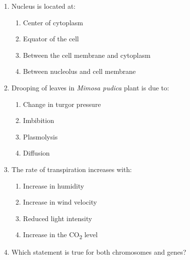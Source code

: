 \begin{enumerate}[label=(\roman*)]

    \item Nucleus is located at:

        \begin{enumerate}[label=(\alph*)]
            \setlength\itemsep{0em}
            \item Center of cytoplasm
            \item Equator of the cell
            \item Between the cell membrane and cytoplasm
            \item Between nucleolus and cell membrane
        \end{enumerate}

    \item Drooping of leaves in \textit{Mimosa pudica} plant is due to:

        \begin{enumerate}[label=(\alph*)]
            \setlength\itemsep{0em}
            \item Change in turgor pressure
            \item Imbibition
            \item Plasmolysis
            \item Diffusion
        \end{enumerate}

    \newpage
    \item The rate of transpiration increases with:

        \begin{enumerate}[label=(\alph*)]
            \setlength\itemsep{0em}
            \item Increase in humidity
            \item Increase in wind velocity
            \item Reduced light intensity
            \item Increase in the CO\textsubscript{2} level
        \end{enumerate}

    \item Which statement is true for both chromosomes and genes?


\end{enumerate}
